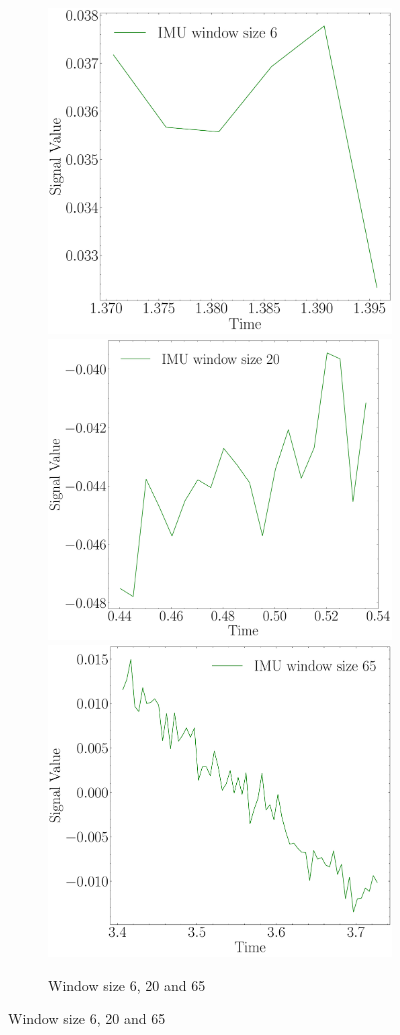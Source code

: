 \begin{figure}
    \begin{subfigure}{\linewidth}
    \includegraphics[width=.3\linewidth]{images/fig_chapter4/imu_windows/imu_window_size_6.pdf}\hfill
    \includegraphics[width=.3\linewidth]{images/fig_chapter4/imu_windows/imu_window_size_20.pdf}\hfill
    \includegraphics[width=.3\linewidth]{images/fig_chapter4/imu_windows/imu_window_size_65.pdf}\hfill
    \caption{Window size 6, 20 and 65}
    \end{subfigure}\par\medskip
    

\end{figure}
